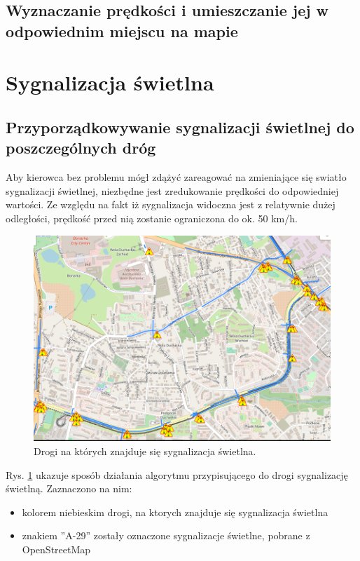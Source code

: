 \newpage
\subsection{Wyznaczanie prędkości i umieszczanie jej w odpowiednim miejscu na mapie}

\newpage
\section{Sygnalizacja świetlna}
\subsection{Przyporządkowywanie sygnalizacji świetlnej do poszczególnych dróg}

Aby kierowca bez problemu mógł zdążyć zareagować na zmieniające się swiatło sygnalizacji świetlnej, niezbędne jest zredukowanie prędkości do odpowiedniej wartości. Ze względu na fakt iż sygnalizacja widoczna jest z relatywnie dużej odległości, prędkość przed nią zostanie ograniczona do ok. 50 km/h.


\begin{figure}[h]
\caption{Drogi na których znajduje się sygnalizacja świetlna.}
\label{sec:PrzejazdyKolejowe}
\centering
\includegraphics[width=1.1\textwidth]{traffic_sight}
\end{figure}

Rys. \ref{sec:PrzejazdyKolejowe} ukazuje sposób działania algorytmu przypisującego do drogi sygnalizację świetlną. Zaznaczono na nim:
\begin{itemize}
\item kolorem niebieskim drogi, na ktorych znajduje się sygnalizacja świetlna
\item znakiem ''A-29'' zostały oznaczone sygnalizacje świetlne, pobrane z OpenStreetMap
\end{itemize}

